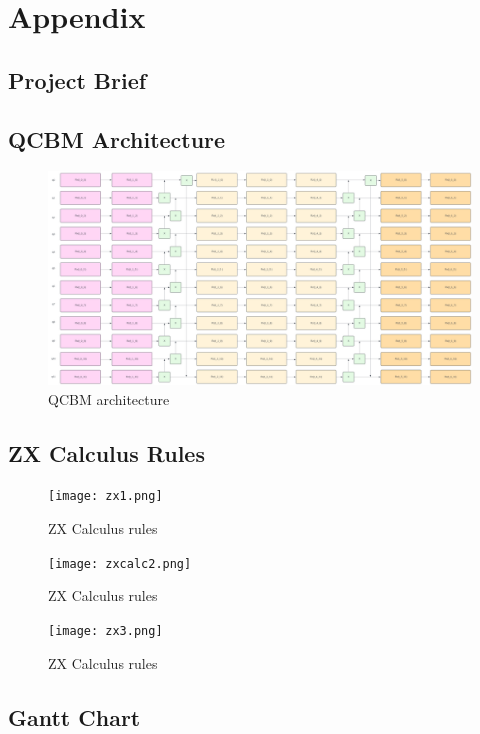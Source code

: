 \documentclass[12pt]{article}
\numberwithin{equation}{section}
\begin{document}
\clearpage
\printbibliography
\clearpage
\section{Appendix}
\subsection{Project Brief}

\clearpage


\subsection{QCBM Architecture}
\begin{figure}[h!]
    \centering
    \includegraphics[scale=0.6, angle=270]{qcbm1.png}
    \caption{QCBM architecture}
\end{figure}
\clearpage

\subsection{ZX Calculus Rules}
\autocite{zxcalc}
\begin{figure}[h!]
    \centering
    \texttt{[image: zx1.png]}
    \caption{ZX Calculus rules}
    \label{fig:enter-label}
\end{figure}
\begin{figure}
    \centering
    \texttt{[image: zxcalc2.png]}
    \caption{ZX Calculus rules}
    \label{fig:enter-label}
\end{figure}
\begin{figure}[h!]
    \centering
    \texttt{[image: zx3.png]}
    \caption{ZX Calculus rules}
    \label{fig:enter-label}
\end{figure}
\clearpage
\subsection{Gantt Chart}

\clearpage
\end{document}
